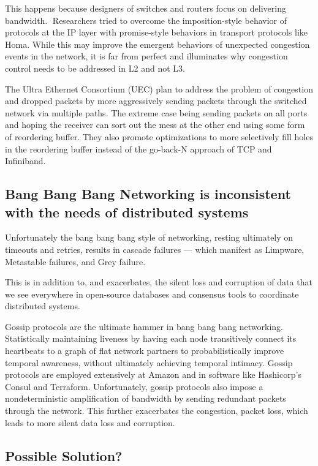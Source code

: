 \documentclass[../../../OAE-SPEC-MAIN.tex]{subfiles}
\begin{document}
This happens because designers of switches and routers focus on delivering bandwidth. 
Researchers tried to overcome the imposition-style behavior of protocols at the IP layer with promise-style behaviors in transport protocols like Homa.  While this may improve the emergent behaviors of unexpected congestion events in the network, it is far from perfect and illuminates why congestion  control needs to be addressed in L2 and not L3.

The Ultra Ethernet Consortium (UEC) plan to address the problem of congestion and dropped packets by more aggressively sending packets through the switched network via multiple paths. The extreme case being sending packets on all ports and hoping the receiver can sort out the mess at the other end using some form of reordering buffer. They also promote optimizations to more selectively fill holes in the reordering buffer instead of the go-back-N approach of TCP and Infiniband.

\subsection{Bang Bang Bang Networking is inconsistent with the needs of distributed systems}

Unfortunately the bang bang bang style of networking, resting ultimately on timeouts and retries, results in cascade failures — which manifest as Limpware, Metastable failures, and Grey failure.

This is in addition to, and exacerbates, the silent loss and corruption of data that we see everywhere in open-source databases and consensus tools to coordinate distributed systems. 

Gossip protocols are the ultimate hammer in bang bang bang networking. Statistically maintaining liveness by having each node transitively connect its heartbeats to a graph of flat network partners to probabilistically improve temporal awareness, without ultimately achieving temporal intimacy. Gossip protocols are employed extensively at Amazon and in software like Hashicorp’s Consul and Terraform.
Unfortunately, gossip protocols also impose a nondeterministic amplification of bandwidth by sending redundant packets through the network.  This further exacerbates the congestion, packet loss, which leads to more silent data loss and corruption.

\subsection{Possible Solution?}
\end{document}
